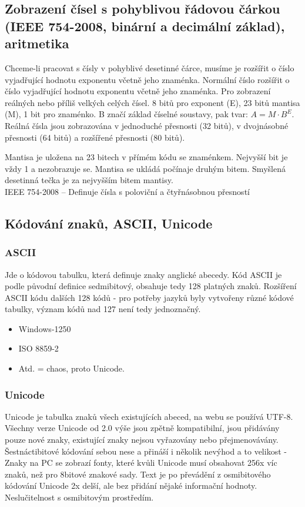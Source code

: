 \subsection[Zobrazení čísel s pohyblivou řádovou čárkou, aritmetika]{Zobrazení čísel s pohyblivou řádovou čárkou (IEEE 754-2008, binární a decimální základ), aritmetika}
Chceme-li pracovat s čísly v pohyblivé desetinné čárce, musíme je rozšířit o číslo vyjadřující hodnotu exponentu včetně jeho znaménka. Normální číslo rozšířit o číslo vyjadřující hodnotu exponentu včetně jeho znaménka. Pro zobrazení reálných nebo příliš velkých celých čísel. 8 bitů pro exponent (E), 23 bitů mantisa (M), 1 bit pro znaménko. B značí základ číselné soustavy, pak tvar: $A = M \cdot B^E$. Reálná čísla jsou zobrazována v  jednoduché přesnosti (32 bitů), v dvojnásobné přesnosti (64 bitů) a rozšířené přesnosti (80 bitů).


Mantisa je uložena na 23 bitech v přímém kódu se znaménkem. Nejvyšší bit je vždy 1 a nezobrazuje se. Mantisa se ukládá počínaje druhým bitem. Smyšlená desetinná tečka je za nejvyšším bitem mantisy.\\
IEEE 754-2008 -- Definuje čísla s poloviční a čtyřnásobnou přesností

\subsection{Kódování znaků, ASCII, Unicode}
\subsubsection{ASCII}
Jde o kódovou tabulku, která definuje znaky anglické abecedy. Kód ASCII je podle původní definice sedmibitový, obsahuje tedy 128 platných znaků. Rozšíření ASCII kódu dalších 
128 kódů - pro potřeby jazyků byly vytvořeny různé kódové tabulky, význam kódů nad 127 není tedy jednoznačný.
\begin{itemize}
\item Windows-1250
\item ISO 8859-2
\item Atd. = chaos, proto Unicode.
\end{itemize}

\subsubsection{Unicode}
Unicode je tabulka znaků všech existujících abeced, na webu se používá UTF-8.
Všechny verze Unicode od 2.0 výše jsou zpětně kompatibilní, jsou přidávány pouze nové znaky, existující znaky nejsou vyřazovány nebo přejmenovávány.
Šestnáctibitové kódování sebou nese a přináší i několik nevýhod a to velikost - Znaky na PC se zobrazí fonty, které kvůli Unicode musí obsahovat 256x víc znaků, než pro 8bitové znakové sady. Text je po převádění z osmibitového kódování Unicode 2x delší, ale bez přidání nějaké informační hodnoty. Neslučitelnost s osmibitovým prostředím.

